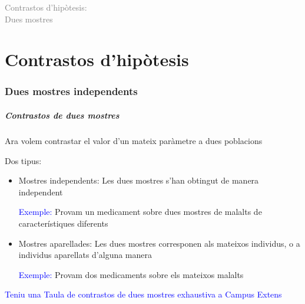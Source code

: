 \documentclass[12pt,t]{beamer}
\title[\red{Matemàtiques III}]{}
\author[]{}
\date{}
\newcommand{\blue}[1]{\textcolor{blue}{#1}}
\newcommand{\gray}[1]{\textcolor{gray}{#1}}
\renewcommand{\emph}[1]{{\color{red}#1}}
\theoremstyle{plain}
\theoremstyle{definition}
\begin{document}

\beamertemplatedotitem

\lstset{breaklines=true}
\lstset{basicstyle=\ttfamily}


\begin{frame}
\vfill
\begin{center}
\gray{\LARGE Contrastos d'hipòtesis:}\\[1ex]

\gray{\LARGE Dues mostres}
\end{center}
\vfill
\end{frame}




 


\part{Contrastos d'hipòtesis}
% 

\section{Dues mostres independents}

\begin{frame}
\frametitle{Contrastos de  dues mostres}

Ara volem contrastar el valor d'un mateix paràmetre a dues poblacions
\medskip

Dos tipus:
\begin{itemize}
\item \emph{Mostres independents:} Les dues mostres s'han obtingut de manera independent
\smallskip

\blue{Exemple:} Provam un medicament sobre dues mostres de malalts de característiques diferents
\medskip

\item \emph{Mostres aparellades:} Les dues mostres corresponen als mateixos
individus, o a individus aparellats d'alguna manera
\smallskip

\blue{Exemple:} Provam dos medicaments sobre els mateixos malalts
\end{itemize}



\blue{Teniu una Taula de contrastos de dues mostres exhaustiva a Campus Extens}

\end{frame}
\end{document}
